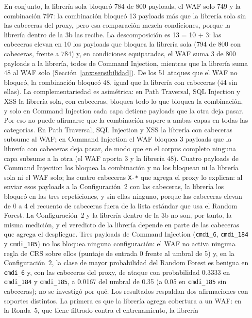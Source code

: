 En conjunto, la librería sola bloqueó 784 de 800 payloads, el WAF solo 749 y la combinación 797: la
combinación bloqueó 13 payloads más que la librería sola sin las cabeceras del proxy, pero esa
comparación mezcla condiciones, porque la librería dentro de la 3b las recibe. La descomposición es
13 = 10 + 3: las cabeceras elevan en 10 los payloads que bloquea la librería sola (794 de 800 con
cabeceras, frente a 784) y, en condiciones equiparadas, el WAF suma 3 de 800 payloads a la
librería, todos de Command Injection, mientras que la librería suma 48 al WAF solo
(Sección~\ref{anx:sensibilidad}). De los 51 ataques que el WAF no bloqueó, la combinación bloqueó
48, igual que la librería con cabeceras (44 sin ellas). La complementariedad es asimétrica: en Path
Traversal, SQL Injection y XSS la librería sola, con cabeceras, bloquea todo lo que bloquea la
combinación, y solo en Command Injection cada capa detiene payloads que la otra deja pasar. Por eso no puede afirmarse que la combinación supere a ambas capas en todas
las categorías. En Path Traversal, SQL Injection y XSS la librería con cabeceras subsume al WAF; en
Command Injection el WAF bloquea 3 payloads que la librería con cabeceras deja pasar, de modo que en
el corpus completo ninguna capa subsume a la otra (el WAF aporta 3 y la librería 48). Cuatro payloads de Command Injection los bloquea
la combinación y no los bloquean ni la librería sola ni el WAF solo; las cuatro cabeceras
\texttt{X-*} que agrega el proxy lo explican: al enviar esos payloads a la Configuración~2 con las
cabeceras, la librería los bloqueó en las tres repeticiones, y sin ellas ninguno, porque las
cabeceras elevan de 0 a 4 el recuento de cabeceras fuera de la lista estándar que usa el Random
Forest. La Configuración~2 y la librería dentro de la 3b no son, por tanto, la misma medición, y el
veredicto de la librería depende en parte de las cabeceras que agrega el despliegue. Tres payloads
de Command Injection (\texttt{cmdi\_6}, \texttt{cmdi\_184} y \texttt{cmdi\_185}) no los bloquea
ninguna configuración: el WAF no activa ninguna regla de CRS sobre ellos (puntaje de entrada 0
frente al umbral de 5) y, en la Configuración~2, la clase de mayor probabilidad del Random Forest
es benigna en \texttt{cmdi\_6} y, con las cabeceras del proxy, de ataque con probabilidad 0.3333 en
\texttt{cmdi\_184} y \texttt{cmdi\_185}, a 0.0167 del umbral de 0.35 (a 0.05 en \texttt{cmdi\_185}
sin cabeceras); no se investigó por qué. Los resultados respaldan dos afirmaciones con soportes distintos. La primera es que la librería
agrega cobertura a un WAF: en la Ronda~5, que tiene filtrado contra el entrenamiento, la librería
